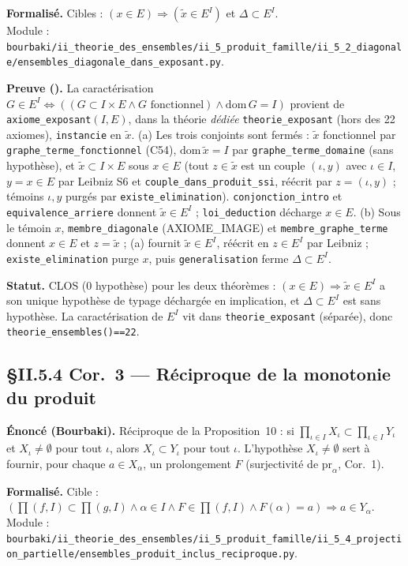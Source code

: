 \textbf{Formalisé.} Cibles : $(x\in E)\Rightarrow(\tilde{x}\in E^I)$ et $\Delta\subset E^I$. \\
Module : \texttt{bourbaki/ii\_theorie\_des\_ensembles/ii\_5\_produit\_famille/ii\_5\_2\_diagonale/ensembles\_diagonale\_dans\_exposant.py}.

\textbf{Preuve (\Nstar).} La caractérisation $G\in E^I\Leftrightarrow((G\subset I\times E\wedge G\text{ fonctionnel})\wedge \mathrm{dom}\,G=I)$ provient de \texttt{axiome\_exposant}$(I,E)$, dans la théorie \emph{dédiée} \texttt{theorie\_exposant} (hors des 22 axiomes), \texttt{instancie} en $\tilde{x}$. (a) Les trois conjoints sont fermés : $\tilde{x}$ fonctionnel par \texttt{graphe\_terme\_fonctionnel} (C54), $\mathrm{dom}\,\tilde{x}=I$ par \texttt{graphe\_terme\_domaine} (sans hypothèse), et $\tilde{x}\subset I\times E$ sous $x\in E$ (tout $z\in\tilde{x}$ est un couple $(\iota,y)$ avec $\iota\in I$, $y=x\in E$ par Leibniz S6 et \texttt{couple\_dans\_produit\_ssi}, réécrit par $z=(\iota,y)$ ; témoins $\iota,y$ purgés par \texttt{existe\_elimination}). \texttt{conjonction\_intro} et \texttt{equivalence\_arriere} donnent $\tilde{x}\in E^I$ ; \texttt{loi\_deduction} décharge $x\in E$. (b) Sous le témoin $x$, \texttt{membre\_diagonale} (AXIOME\_IMAGE) et \texttt{membre\_graphe\_terme} donnent $x\in E$ et $z=\tilde{x}$ ; (a) fournit $\tilde{x}\in E^I$, réécrit en $z\in E^I$ par Leibniz ; \texttt{existe\_elimination} purge $x$, puis \texttt{generalisation} ferme $\Delta\subset E^I$.

\textbf{Statut.} CLOS (0 hypothèse) pour les deux théorèmes : $(x\in E)\Rightarrow\tilde{x}\in E^I$ a son unique hypothèse de typage déchargée en implication, et $\Delta\subset E^I$ est sans hypothèse. La caractérisation de $E^I$ vit dans \texttt{theorie\_exposant} (séparée), donc \texttt{theorie\_ensembles()==22}.


\subsection{§II.5.4 Cor.~3 --- Réciproque de la monotonie du produit}
\textbf{Énoncé (Bourbaki).} Réciproque de la Proposition~10 : si $\prod_{\iota\in I}X_\iota\subset\prod_{\iota\in I}Y_\iota$ et $X_\iota\neq\emptyset$ pour tout $\iota$, alors $X_\iota\subset Y_\iota$ pour tout $\iota$. L'hypothèse $X_\iota\neq\emptyset$ sert à fournir, pour chaque $a\in X_\alpha$, un prolongement $F$ (surjectivité de $\mathrm{pr}_\alpha$, Cor.~1).

\textbf{Formalisé.} Cible : $(\prod(f,I)\subset\prod(g,I)\wedge \alpha\in I\wedge F\in\prod(f,I)\wedge F(\alpha)=a)\Rightarrow a\in Y_\alpha$. \\
Module : \texttt{bourbaki/ii\_theorie\_des\_ensembles/ii\_5\_produit\_famille/ii\_5\_4\_projection\_partielle/ensembles\_produit\_inclus\_reciproque.py}.

